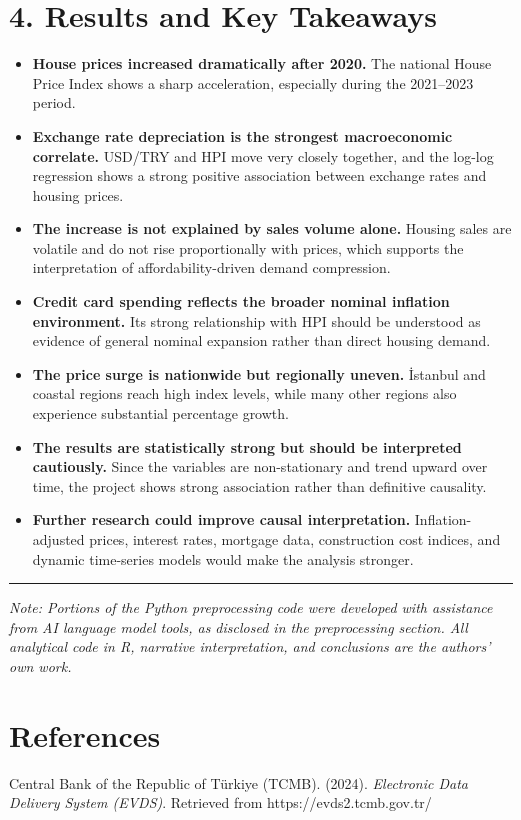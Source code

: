 \documentclass[
  11pt,
  a4paper,
  DIV=11,
  numbers=noendperiod]{scrartcl}
\begin{document}
\section{4. Results and Key Takeaways}\label{results-and-key-takeaways}

\begin{itemize}
\item
  \textbf{House prices increased dramatically after 2020.} The national
  House Price Index shows a sharp acceleration, especially during the
  2021--2023 period.
\item
  \textbf{Exchange rate depreciation is the strongest macroeconomic
  correlate.} USD/TRY and HPI move very closely together, and the
  log-log regression shows a strong positive association between
  exchange rates and housing prices.
\item
  \textbf{The increase is not explained by sales volume alone.} Housing
  sales are volatile and do not rise proportionally with prices, which
  supports the interpretation of affordability-driven demand
  compression.
\item
  \textbf{Credit card spending reflects the broader nominal inflation
  environment.} Its strong relationship with HPI should be understood as
  evidence of general nominal expansion rather than direct housing
  demand.
\item
  \textbf{The price surge is nationwide but regionally uneven.} İstanbul
  and coastal regions reach high index levels, while many other regions
  also experience substantial percentage growth.
\item
  \textbf{The results are statistically strong but should be interpreted
  cautiously.} Since the variables are non-stationary and trend upward
  over time, the project shows strong association rather than definitive
  causality.
\item
  \textbf{Further research could improve causal interpretation.}
  Inflation-adjusted prices, interest rates, mortgage data, construction
  cost indices, and dynamic time-series models would make the analysis
  stronger.
\end{itemize}

\begin{center}\rule{0.5\linewidth}{0.5pt}\end{center}

\emph{Note: Portions of the Python preprocessing code were developed
with assistance from AI language model tools, as disclosed in the
preprocessing section. All analytical code in R, narrative
interpretation, and conclusions are the authors' own work.}

\section{References}\label{references}

Central Bank of the Republic of Türkiye (TCMB). (2024). \emph{Electronic
Data Delivery System (EVDS)}. Retrieved from https://evds2.tcmb.gov.tr/
\end{document}
